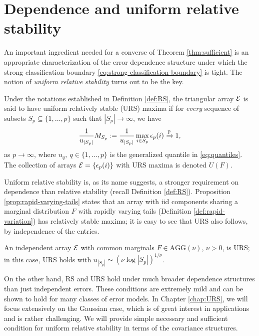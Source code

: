 \section{Dependence and uniform relative stability}
\label{subsec:URS}

An important ingredient needed for a converse of Theorem \ref{thm:sufficient} is an appropriate characterization of the error dependence structure under which the strong classification boundary \eqref{eq:strong-classification-boundary} is tight.
The notion of \emph{uniform relative stability} turns out to be the key.

\begin{definition} \label{def:URS}
Under the notations established in Definition \ref{def:RS}, the triangular array ${\cal E}$ is said to have uniform relatively stable (URS) maxima if for \emph{every} sequence of subsets $S_p\subseteq\{1,\ldots,p\}$ such that $|S_p| \to \infty$, we have
\begin{equation} \label{eq:URS-condition}
    \frac{1}{u_{|S_p|}} M_{S_p} := \frac{1}{u_{|S_p|}} \max_{i\in S_p} \epsilon_p(i) \xrightarrow{\P} 1,
\end{equation}
as $p\to\infty$, where $u_q,\ q\in \{1,\ldots,p\}$ is the generalized quantile in \eqref{eq:quantiles}.
The collection of arrays ${\cal E} = \{ \epsilon_p(i) \}$ with URS maxima is 
denoted $U(F)$.
\end{definition}

Uniform relative stability is, as its name suggests, a stronger requirement on dependence than relative stability (recall Definition \ref{def:RS}). 
Proposition \ref{prop:rapid-varying-tails} states that an array with iid components sharing a marginal distribution $F$ with rapidly varying tails (Definition  \ref{def:rapid-variation}) has relatively stable maxima; it is easy to see that URS also follows, by independence of the entries.

\begin{corollary} \label{cor:AGG-is-URS}
An independent array ${\cal E}$ with common marginals $F\in\text{AGG}(\nu)$, $\nu>0$, is URS; in this case, URS holds with $u_{|S_p|} \sim \left(\nu\log{|S_p|}\right)^{1/\nu}$.
\end{corollary}

On the other hand, RS and URS hold under much broader dependence structures than just 
independent errors. 
These conditions are extremely mild and can be shown to hold for many classes of error models.  
In Chapter \ref{chap:URS}, we will focus extensively on the Gaussian case, which is of great interest in applications and is rather challenging. 
We will provide simple necessary and sufficient condition for uniform relative stability in terms of the covariance structures.

